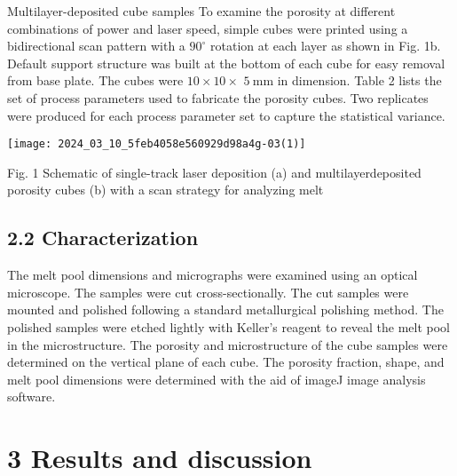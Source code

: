 \documentclass[10pt]{article}
\begin{document}
Multilayer-deposited cube samples To examine the porosity at different combinations of power and laser speed, simple cubes were printed using a bidirectional scan pattern with a $90^{\circ}$ rotation at each layer as shown in Fig. 1b. Default support structure was built at the bottom of each cube for easy removal from base plate. The cubes were $10 \times 10 \times$ $5 \mathrm{~mm}$ in dimension. Table 2 lists the set of process parameters used to fabricate the porosity cubes. Two replicates were produced for each process parameter set to capture the statistical variance.

\begin{center}
\texttt{[image: 2024\_03\_10\_5feb4058e560929d98a4g-03(1)]}
\end{center}

Fig. 1 Schematic of single-track laser deposition (a) and multilayerdeposited porosity cubes (b) with a scan strategy for analyzing melt

\subsection*{2.2 Characterization}
The melt pool dimensions and micrographs were examined using an optical microscope. The samples were cut cross-sectionally. The cut samples were mounted and polished following a standard metallurgical polishing method. The polished samples were etched lightly with Keller's reagent to reveal the melt pool in the microstructure. The porosity and microstructure of the cube samples were determined on the vertical plane of each cube. The porosity fraction, shape, and melt pool dimensions were determined with the aid of imageJ image analysis software.

\section*{3 Results and discussion}
\end{document}
